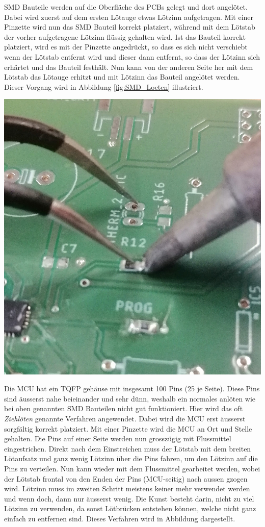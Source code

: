{\begin{minipage}[b][8cm][t]{0.5\textwidth}
SMD Bauteile werden auf die Oberfläche des PCBs gelegt und dort angelötet. Dabei wird zuerst auf dem ersten Lötauge etwas Lötzinn aufgetragen. Mit einer Pinzette wird nun das SMD Bauteil korrekt platziert, während mit dem Lötstab der vorher aufgetragene Lötzinn flüssig gehalten wird. Ist das Bauteil korrekt platziert, wird es mit der Pinzette angedrückt, so dass es sich nicht verschiebt wenn der Lötstab entfernt wird und dieser dann entfernt, so dass der Lötzinn sich erhärtet und das Bauteil festhält. Nun kann von der anderen Seite her mit dem Lötstab das Lötauge erhitzt und mit Lötzinn das Bauteil angelötet werden. Dieser Vorgang wird in Abbildung \ref{fig:SMD_Loeten} illustriert.
\end{minipage}}
{\begin{minipage}[b][8cm][t]{0.49\textwidth}
\centering
\includegraphics[width=0.8\linewidth]{graphics/HW_Val/SMD_Loeten.jpg}
\label{fig:SMD_Loeten}
\end{minipage}}


Die MCU hat ein TQFP gehäuse mit insgesamt 100 Pins (25 je Seite). Diese Pins sind äusserst nahe beieinander und sehr dünn, weshalb ein normales anlöten wie bei oben genannten SMD Bauteilen nicht gut funktioniert. Hier wird das oft \textit{Ziehlöten} genannte Verfahren angewendet. Dabei wird die MCU erst äusserst sorgfältig korrekt platziert. Mit einer Pinzette wird die MCU an Ort und Stelle gehalten. Die Pins auf einer Seite werden nun grosszügig mit Flussmittel eingestrichen. Direkt nach dem Einstreichen muss der Lötstab mit dem breiten Lötaufsatz und ganz wenig Lötzinn über die Pins fahren, um den Lötzinn auf die Pins zu verteilen. Nun kann wieder mit dem Flussmittel gearbeitet werden, wobei der Lötstab frontal von den Enden der Pins (MCU-seitig) nach aussen gzogen wird. Lötzinn muss im zweiten Schritt meistens keiner mehr verwendet werden und wenn doch, dann nur äusserst wenig. Die Kunst besteht darin, nicht zu viel Lötzinn zu verwenden, da sonst Lötbrücken entstehen können, welche nicht ganz einfach zu entfernen sind. Dieses Verfahren wird in Abbildung  dargestellt.


